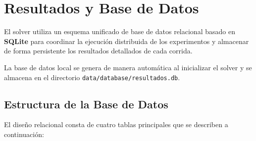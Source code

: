 \section{Resultados y Base de Datos}
\label{sec:resultados}

El solver utiliza un esquema unificado de base de datos relacional basado en \textbf{SQLite} para coordinar la ejecución distribuida de los experimentos y almacenar de forma persistente los resultados detallados de cada corrida.

La base de datos local se genera de manera automática al inicializar el solver y se almacena en el directorio \texttt{data/database/resultados.db}.

\subsection{Estructura de la Base de Datos}

El diseño relacional consta de cuatro tablas principales que se describen a continuación:


